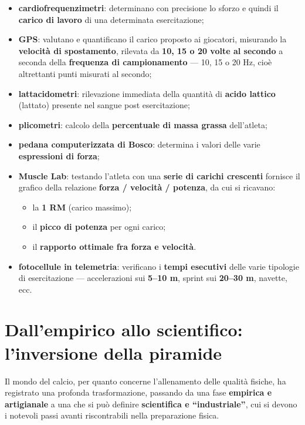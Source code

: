 \begin{itemize}
  \item \textbf{cardiofrequenzimetri}: determinano con precisione lo sforzo e quindi il
    \textbf{carico di lavoro} di una determinata esercitazione;
  \item \textbf{GPS}: valutano e quantificano il carico proposto ai giocatori, misurando la
    \textbf{velocità di spostamento}, rilevata da \textbf{10, 15 o 20 volte al secondo} a seconda
    della \textbf{frequenza di campionamento} --- 10, 15 o 20 Hz, cioè altrettanti punti misurati
    al secondo;
  \item \textbf{lattacidometri}: rilevazione immediata della quantità di \textbf{acido lattico}
    (lattato) presente nel sangue post esercitazione;
  \item \textbf{plicometri}: calcolo della \textbf{percentuale di massa grassa} dell'atleta;
  \item \textbf{pedana computerizzata di Bosco}: determina i valori delle varie \textbf{espressioni
    di forza};
  \item \textbf{Muscle Lab}: testando l'atleta con una \textbf{serie di carichi crescenti} fornisce
    il grafico della relazione \textbf{forza / velocità / potenza}, da cui si ricavano:
    \begin{itemize}
      \item la \textbf{1 RM} (carico massimo);
      \item il \textbf{picco di potenza} per ogni carico;
      \item il \textbf{rapporto ottimale fra forza e velocità}.
    \end{itemize}
  \item \textbf{fotocellule in telemetria}: verificano i \textbf{tempi esecutivi} delle varie
    tipologie di esercitazione --- accelerazioni sui \textbf{5--10 m}, sprint sui \textbf{20--30
    m}, navette, ecc.
\end{itemize}

\section{Dall'empirico allo scientifico: l'inversione della piramide}
\label{sec:inversione-piramide}

Il mondo del calcio, per quanto concerne l'allenamento delle qualità fisiche, ha registrato una
profonda trasformazione, passando da una fase \textbf{empirica e artigianale} a una che si può
definire \textbf{scientifica e ``industriale''}, cui si devono i notevoli passi avanti riscontrabili
nella preparazione fisica.

